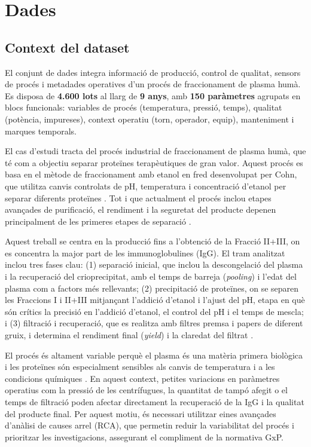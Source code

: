 \section{Dades}

\subsection{Context del dataset}

El conjunt de dades integra informació de producció, control de qualitat, sensors de procés i metadades operatives d'un procés de fraccionament de plasma humà. Es disposa de \textbf{4.600 lots} al llarg de \textbf{9 anys}, amb \textbf{150 paràmetres} agrupats en blocs funcionals: variables de procés (temperatura, pressió, temps), qualitat (potència, impureses), context operatiu (torn, operador, equip), manteniment i marques temporals.

El cas d'estudi tracta del procés industrial de fraccionament de plasma humà, que té com a objectiu separar proteïnes terapèutiques de gran valor. Aquest procés es basa en el mètode de fraccionament amb etanol en fred desenvolupat per Cohn, que utilitza canvis controlats de pH, temperatura i concentració d'etanol per separar diferents proteïnes \cite{cohn1946,burnouf2007_modern}. Tot i que actualment el procés inclou etapes avançades de purificació, el rendiment i la seguretat del producte depenen principalment de les primeres etapes de separació \cite{burnouf2007_modern}.

Aquest treball se centra en la producció fins a l'obtenció de la Fracció II+III, on es concentra la major part de les immunoglobulines (IgG). El tram analitzat inclou tres fases clau: (1) separació inicial, que inclou la descongelació del plasma i la recuperació del crioprecipitat, amb el temps de barreja (\emph{pooling}) i l'edat del plasma com a factors més rellevants; (2) precipitació de proteïnes, on se separen les Fraccions I i II+III mitjançant l'addició d'etanol i l'ajust del pH, etapa en què són crítics la precisió en l'addició d'etanol, el control del pH i el temps de mescla; i (3) filtració i recuperació, que es realitza amb filtres premsa i papers de diferent gruix, i determina el rendiment final (\emph{yield}) i la claredat del filtrat \cite{burnouf2007_modern,cohn1946}.

El procés és altament variable perquè el plasma és una matèria primera biològica i les proteïnes són especialment sensibles als canvis de temperatura i a les condicions químiques \cite{burnouf2007_modern,gamp5}. En aquest context, petites variacions en paràmetres operatius com la pressió de les centrífugues, la quantitat de tampó afegit o el temps de filtració poden afectar directament la recuperació de la IgG i la qualitat del producte final. Per aquest motiu, és necessari utilitzar eines avançades d'anàlisi de causes arrel (RCA), que permetin reduir la variabilitat del procés i prioritzar les investigacions, assegurant el compliment de la normativa GxP.

